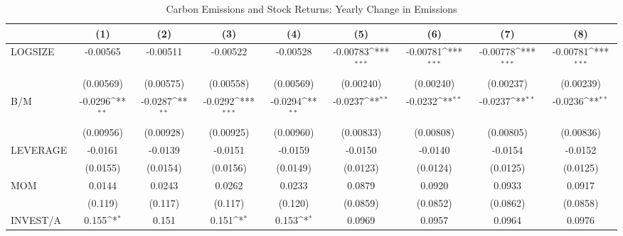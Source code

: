\begin{table}[htbp]\centering
\def\sym#1{\ifmmode^{#1}\else\(^{#1}\)\fi}
\caption{Carbon Emissions and Stock Returns: Yearly Change in Emissions}
\begin{tabular}{l*{8}{c}}
\hline\hline
                    &\multicolumn{1}{c}{(1)}         &\multicolumn{1}{c}{(2)}         &\multicolumn{1}{c}{(3)}         &\multicolumn{1}{c}{(4)}         &\multicolumn{1}{c}{(5)}         &\multicolumn{1}{c}{(6)}         &\multicolumn{1}{c}{(7)}         &\multicolumn{1}{c}{(8)}         \\
\hline
LOGSIZE             &    -0.00565         &    -0.00511         &    -0.00522         &    -0.00528         &    -0.00783\sym{***}&    -0.00781\sym{***}&    -0.00778\sym{***}&    -0.00781\sym{***}\\
                    &   (0.00569)         &   (0.00575)         &   (0.00558)         &   (0.00569)         &   (0.00240)         &   (0.00240)         &   (0.00237)         &   (0.00239)         \\
B/M                 &     -0.0296\sym{**} &     -0.0287\sym{**} &     -0.0292\sym{***}&     -0.0294\sym{**} &     -0.0237\sym{**} &     -0.0232\sym{**} &     -0.0237\sym{**} &     -0.0236\sym{**} \\
                    &   (0.00956)         &   (0.00928)         &   (0.00925)         &   (0.00960)         &   (0.00833)         &   (0.00808)         &   (0.00805)         &   (0.00836)         \\
LEVERAGE            &     -0.0161         &     -0.0139         &     -0.0151         &     -0.0159         &     -0.0150         &     -0.0140         &     -0.0154         &     -0.0152         \\
                    &    (0.0155)         &    (0.0154)         &    (0.0156)         &    (0.0149)         &    (0.0123)         &    (0.0124)         &    (0.0125)         &    (0.0125)         \\
MOM                 &      0.0144         &      0.0243         &      0.0262         &      0.0233         &      0.0879         &      0.0920         &      0.0933         &      0.0917         \\
                    &     (0.119)         &     (0.117)         &     (0.117)         &     (0.120)         &    (0.0859)         &    (0.0852)         &    (0.0862)         &    (0.0858)         \\
INVEST/A            &       0.155\sym{*}  &       0.151         &       0.151\sym{*}  &       0.153\sym{*}  &      0.0969         &      0.0957         &      0.0964         &      0.0976         \\

\end{tabular}
\end{table}
